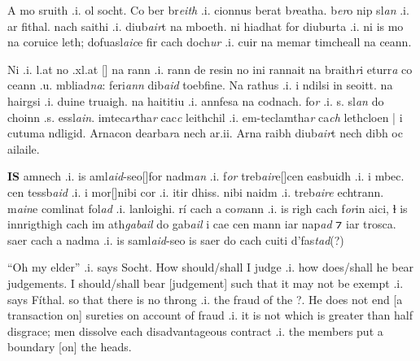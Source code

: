 \documentclass[11pt]{article}
\begin{document}
\begin{pages}
  \begin{Leftside}
    \beginnumbering
    
    \pstart

    A mo sruith .i. ol socht. Co ber br\emph{eith} .i. cionnus berat b\emph{r}eatha.  b\emph{er}o nip sl\emph{an} .i. ar fithal.  nach saithi .i. diub\emph{air}t na mboeth.  ni hiadhat  for diuburta .i. ni is mo na coruice leth; dofuasl\emph{aic}e fir cach doch\emph{ur} .i. cuir na memar timcheall na ceann. 
    \pend

    \pstart
    Ni  .i. l.at no .xl.at [\hspace{2mm}] na rann .i. rann de resin  no ini rannait na braith\emph{r}i eturr\emph{a} co ceann .u. mbliad\emph{na}: feri\emph{ann} dib\emph{aid} toebfine.  Na rathus .i. i ndilsi in seoitt. na hairgsi .i. duine truaigh.  na haititiu .i. annfesa na codnach.  fo\emph{r}  .i. s. sl\emph{an} do choinn .s. essl\emph{ain}. imteca\emph{r}tha\emph{r} cac\emph{c} leithchil  .i. em-teclamtha\emph{r} ca\emph{ch} lethcloen | i cutuma ndligid.  Arnacon dearba\emph{r}a nech ar.ii.  Arna raibh diub\emph{air}t nech dibh oc ailaile.
    \pend
    
    \pstart
    \textbf{IS} amnech .i. is aml\emph{aid}-seo[\hspace{2mm}]for nadm\emph{an} .i. f\emph{or} treb\emph{air}e[\hspace{2mm}]cen easbuidh .i. i mbec.  cen tessb\emph{aid} .i. i mor[\hspace{2mm}]nibi cor .i. itir dhiss.  nibi naidm .i. treb\emph{aire} echtrann.  m\emph{ain}e comlinat fol\emph{ad} .i. lanloighi. r\'{i} cach a co\emph{m}ann .i. is righ cach f\emph{or}in  aici, ɫ is innrigthigh cach im ath\emph{gabail} do gab\emph{ail} i cae cen mann iar nap\emph{ad} ⁊ iar trosca.  saer cach a nadma .i. is saml\emph{aid}-seo is saer do cach cuiti  d'fas\emph{tad}(?)
    \pend
    \endnumbering
  \end{Leftside}

  \begin{Rightside}
    \beginnumbering
    
    \pstart
    \enquote{Oh my elder} .i. says Socht.  How should/shall I judge .i. how does/shall he bear judgements.  I should/shall bear [judgement] such that it may not be exempt .i. says F\'{i}thal. so that there is no throng .i. the fraud of the ?.  He does not end [a transaction on] sureties on account of fraud .i. it is not which is greater than half disgrace; men dissolve each disadvantageous contract .i. the members put a boundary [on] the heads.   
    \pend
    

\end{Rightside}
\end{pages}
\end{document}
